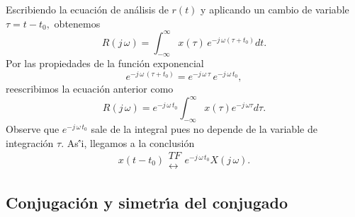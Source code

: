 Escribiendo la ecuaci\'{o}n de an\'{a}lisis de $r\left( t\right)$ 
y aplicando un cambio de variable $\tau =t-t_{0},$ obtenemos
\begin{equation}
  R\left( j \, \omega \right) =
  \int_{-\infty }^{\infty }x\left( \tau \right) \, e^{-j \, \omega \left( \tau +t_{0}\right) }dt.
\end{equation}
Por las propiedades de la funci\'{o}n exponencial 
\begin{equation}
e^{-j \, \omega \, \left( \tau +t_{0}\right)} = e^{-j \, \omega \, \tau} \, e^{-j \, \omega \, t_{0}},
\end{equation}
reescribimos la ecuaci\'{o}n anterior como
\begin{equation}
   R\left( j \, \omega \right) = e^{-j \, \omega \, t_{0}} \int_{-\infty }^{\infty }x\left(\tau \right) e^{-j \, \omega \tau }d \tau.
\end{equation}
Observe que $e^{-j \, \omega \, t_{0}}$ sale de la integral pues no depende de la variable de integraci\'{o}n $\tau$.
As\'{'i}, llegamos a la conclusi\'{o}n 
\begin{equation}
        x\left( t-t_{0}\right) 
        \begin{array}{l}
                TF \\ 
                \leftrightarrow
        \end{array}
        e^{-j \, \omega \, t_{0}}X\left( j \, \omega \right) .
\end{equation}

\subsection{Conjugaci\'{o}n y simetr\'{\i}a del conjugado}

